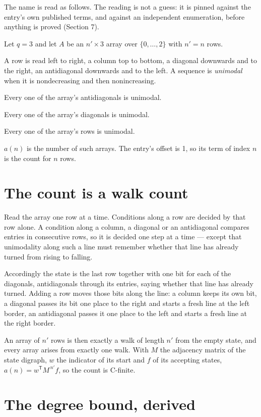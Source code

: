 \documentclass[11pt]{article}
\theoremstyle{definition}
\begin{document}
The name is read as follows. The reading is not a guess: it is pinned against the entry's own published terms, and against an independent enumeration, before anything is proved (Section 7).

Let $q = 3$ and let $A$ be an $n' \times 3$ array over $\{0,\dots,2\}$ with $n' = n$ rows.

A row is read left to right, a column top to bottom, a diagonal downwards and to the right, an antidiagonal downwards and to the left. A sequence is {\itshape unimodal} when it is nondecreasing and then nonincreasing.

Every one of the array's antidiagonals is unimodal.

Every one of the array's diagonals is unimodal.

Every one of the array's rows is unimodal.

$a(n)$ is the number of such arrays. The entry's offset is 1, so its term of index $n$ is the count for $n$ rows.

\section{The count is a walk count}

Read the array one row at a time. Conditions along a row are decided by that row alone. A condition along a column, a diagonal or an antidiagonal compares entries in consecutive rows, so it is decided one step at a time --- except that unimodality along such a line must remember whether that line has already turned from rising to falling.

Accordingly the state is the last row together with one bit for each of the diagonals, antidiagonals through its entries, saying whether that line has already turned. Adding a row moves those bits along the line: a column keeps its own bit, a diagonal passes its bit one place to the right and starts a fresh line at the left border, an antidiagonal passes it one place to the left and starts a fresh line at the right border.

An array of $n'$ rows is then exactly a walk of length $n'$ from the empty state, and every array arises from exactly one walk. With $M$ the adjacency matrix of the state digraph, $w$ the indicator of its start and $f$ of its accepting states, $a(n) = w^{\mathsf T}M^{\,n'}f$, so the count is C-finite.

\section{The degree bound, derived}
\end{document}
